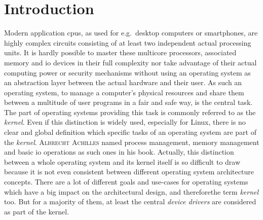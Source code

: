 

\chapter{Introduction}\label{ch:introduction}



Modern application \acp{cpu}, as used for e.g.\ desktop computers or smartphones, are highly complex circuits consisting of at least two independent actual processing units.
It is hardly possible to master these multicore processors, associated memory and \ac{io} devices in their full complexity nor take advantage of their actual computing power or security mechanisms without using an operating system as an abstraction layer between the actual hardware and their user.
As such an operating system, to manage a computer's physical resources and share them between a multitude of user programs in a fair and safe way, is the central task.
The part of operating systems providing this task is commonly referred to as the \textit{kernel}.  
Even if this distinction is widely used, especially for Linux, there is no clear and global definition which specific tasks of an operating system are part of the \textit{kernel}.
\textsc{Albrecht Achilles} named process management, memory management and basic \ac{io} operations as such ones in his book\cite{achilles2006betriebssysteme}.
Actually, this distinction between a whole operating system and its kernel itself is so difficult to draw because it is not even consistent between different operating system architecture concepts.
There are a lot of different goals and use-cases for operating systems which have a big impact on the architectural design, and thereforethe term \textit{kernel} too. 
But for a majority of them, at least the central \textit{device drivers} are considered as part of the kernel. 

